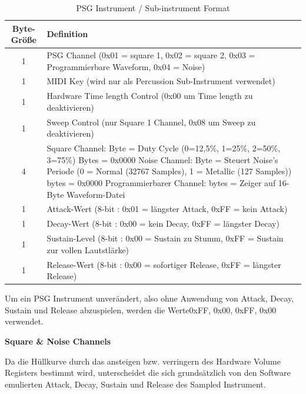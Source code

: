 \documentclass[11pt,a4paper]{scrartcl}
\newcommand{\paratitle}[1] {
    \vspace{5mm}
    \large \textbf{#1} \normalsize
    \vspace{2mm}\newline
}
\begin{document}
\begin{table}[h]
    \centering
    \begin{tabular}{ c | p{15cm} }
        \textbf{Byte-Gr\"o{\ss}e} & \textbf{Definition} \\
				\hline
				1 & PSG Channel (0x01 = square 1, 0x02 = square 2, 0x03 = Programmierbare Waveform, 0x04 = Noise) \\
				\hline
        1 & MIDI Key (wird nur als Percussion Sub-Instrument verwendet)\\
				\hline
        1 & Hardware Time length Control (0x00 um Time length zu deaktivieren)\\
				\hline
        1 & Sweep Control (nur Square 1 Channel, 0x08 um Sweep zu deaktivieren) \\
				\hline
        4 & Square Channel:\newline
					1 Byte = Duty Cycle (0=12,5\%, 1=25\%, 2=50\%, 3=75\%)\newline
					3 Bytes = 0x0000\newline		
					Noise Channel:\newline	
					1 Byte = Steuert Noise's Periode (0 = Normal (32767 Samples), 1 = Metallic (127 Samples)) \newline
					3 bytes = 0x0000
					\newline
					Programmierbarer Channel:\newline
                4 bytes = Zeiger auf 16-Byte Waveform-Datei \\
				\hline
        1 & Attack-Wert (8-bit : 0x01 = l\"angster Attack, 0xFF = kein Attack)\\
				\hline
        1 & Decay-Wert (8-bit : 0x00 = kein Decay, 0xFF = l\"angster Decay) \\
				\hline
        1 & Sustain-Level (8-bit : 0x00 = Sustain zu Stumm, 0xFF = Sustain zur vollen Lautstl\"arke) \\
				\hline
        1 & Release-Wert (8-bit : 0x00 = sofortiger Release, 0xFF = l\"angster Release) \\
				
    \end{tabular}
    \caption{PSG Instrument / Sub-instrument Format}
    \label{table:PSGInstrument}
\end{table}

Um ein PSG Instrument unver\"andert, also ohne Anwendung von Attack, Decay, Sustain und Release abzuspielen, werden die Werte0xFF, 0x00, 0xFF, 0x00 verwendet.

\paratitle{Square \& Noise Channels}
Da die H\"ullkurve durch das ansteigen bzw. verringern des Hardware Volume Registers bestimmt wird, unterscheidet die sich grunds\"atzlich von den  Software emulierten Attack, Decay, Sustain und Release des Sampled Instrument.
\end{document}
